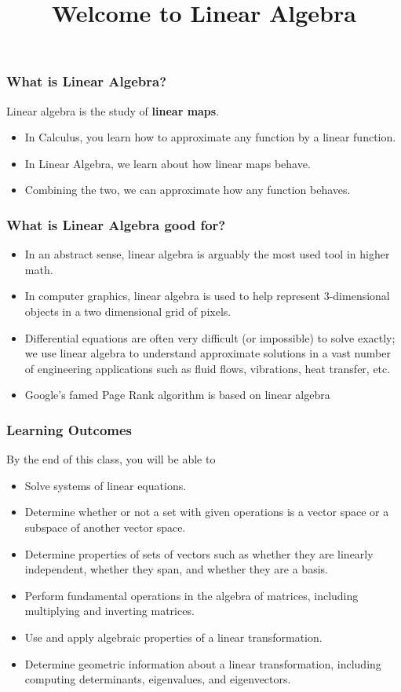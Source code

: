 \documentclass{beamer}
\title{Welcome to Linear Algebra}
\author{\prof}
\date{\ifbool{TR}{August 17, 2017}{August 16,2017}}
\begin{document}
\begin{frame}
\titlepage
\end{frame}

\begin{frame} \frametitle{What is Linear Algebra? }
Linear algebra is the study of {\bf linear maps}.
\begin{itemize}
\item In Calculus, you learn how to approximate any function by a linear function.
\item In Linear Algebra, we learn about how linear maps behave.
\item Combining the two, we can approximate how any function behaves.
\end{itemize}
\end{frame}

\begin{frame} \frametitle{What is Linear Algebra good for?}
\begin{itemize}
\item In an abstract sense, linear algebra is arguably the most used tool in higher math.
\item In computer graphics, linear algebra is used to help represent 3-dimensional objects in a two dimensional grid of pixels.
\item Differential equations are often very difficult (or impossible) to solve exactly; we use linear algebra to understand approximate solutions in a vast number of engineering applications such as fluid flows, vibrations, heat transfer, etc.
\item Google's famed Page Rank algorithm is based on linear algebra
\end{itemize}
\end{frame}

\begin{frame} \frametitle{Learning Outcomes }
By the end of this class, you will be able to
\begin{itemize}
\item Solve systems of linear equations.
\pause \item Determine whether or not a set with given operations is a vector space or a subspace of another vector space.
\pause \item Determine properties of sets of vectors such as whether they are linearly independent, whether they span, and whether they are a basis.
\pause \item Perform fundamental operations in the algebra of matrices, including multiplying and inverting matrices.
\pause \item Use and apply algebraic properties of a linear transformation.
\pause \item Determine geometric information about a linear transformation, including computing determinants, eigenvalues, and eigenvectors.
\end{itemize}
\end{frame}
\end{document}

